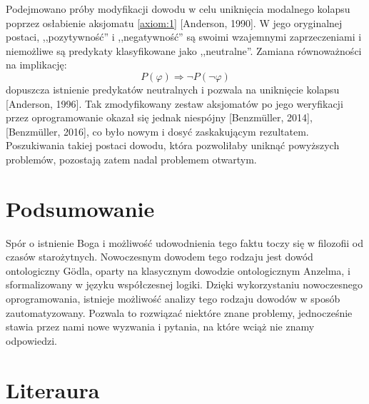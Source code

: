 \documentclass[12pt]{article}
\begin{document}
\begin{multicols}{2}
Podejmowano próby modyfikacji dowodu w celu uniknięcia modalnego kolapsu poprzez osłabienie aksjomatu \ref{axiom:1} [Anderson, 1990]. W jego oryginalnej postaci, ,,pozytywność'' i ,,negatywność'' są swoimi wzajemnymi zaprzeczeniami i niemożliwe są predykaty klasyfikowane jako ,,neutralne''. Zamiana równoważności na implikację:
\begin{equation*}
P(\varphi) \Rightarrow \neg P( \neg \varphi )
\end{equation*}
dopuszcza istnienie predykatów neutralnych i pozwala na uniknięcie kolapsu [Anderson, 1996]. Tak zmodyfikowany zestaw aksjomatów po jego weryfikacji przez oprogramowanie okazał się jednak niespójny [Benzm\"uller, 2014], [Benzm\"uller, 2016], co było nowym i dosyć zaskakującym rezultatem. Poszukiwania takiej postaci dowodu, która pozwoliłaby uniknąć powyższych problemów, pozostają zatem nadal problemem otwartym. 

\section{Podsumowanie} \label{sec:summary}
Spór o istnienie Boga i możliwość udowodnienia tego faktu toczy się w filozofii od czasów starożytnych. Nowoczesnym dowodem tego rodzaju jest dowód ontologiczny G\"odla, oparty na klasycznym dowodzie ontologicznym Anzelma, i sformalizowany w języku współczesnej logiki. Dzięki wykorzystaniu nowoczesnego oprogramowania, istnieje możliwość analizy tego rodzaju dowodów w sposób zautomatyzowany. Pozwala to rozwiązać niektóre znane problemy, jednocześnie stawia przez nami nowe wyzwania i pytania, na które wciąż nie znamy odpowiedzi. 


\section*{Literaura}


\end{multicols}
\end{document}
